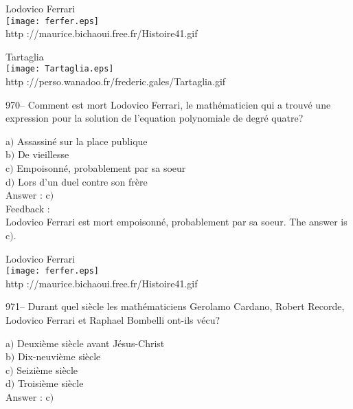 ﻿\documentclass[letterpaper, 12pt]{article}
\begin{document}
        \begin{center}
        Lodovico Ferrari\\
    \texttt{[image: ferfer.eps]}\\
        {\footnotesize http ://maurice.bichaoui.free.fr/Histoire41.gif}
    \end{center}

        \begin{center}
        Tartaglia\\
    \texttt{[image: Tartaglia.eps]}\\
        {\footnotesize http
://perso.wanadoo.fr/frederic.gales/Tartaglia.gif}
    \end{center}

970-- Comment est mort Lodovico Ferrari, le math\'ematicien qui a
trouv\'e une expression pour la solution de l'equation polynomiale
de degr\'e quatre?

a$)$ Assassin\'e sur la place publique \\
b$)$ De vieillesse  \\
c$)$ Empoisonn\'e, probablement par sa soeur \\
d$)$ Lors d'un duel contre son fr\`ere \\

Answer : c$)$\\

Feedback : \\
Lodovico Ferrari est mort empoisonn\'e, probablement par sa soeur.
The answer is c$)$.

        \begin{center}
        Lodovico Ferrari\\
    \texttt{[image: ferfer.eps]}\\
        {\footnotesize http ://maurice.bichaoui.free.fr/Histoire41.gif}
    \end{center}

971-- Durant quel si\`ecle les math\'ematiciens Gerolamo Cardano,
Robert Recorde, Lodovico Ferrari et Raphael Bombelli ont-ils v\'ecu?

a$)$ Deuxi\`eme si\`ecle avant J\'esus-Christ \\
b$)$ Dix-neuvi\`eme si\`ecle \\
c$)$ Seizi\`eme si\`ecle  \\
d$)$ Troisi\`eme si\`ecle \\

Answer : c$)$\\
\end{document}

